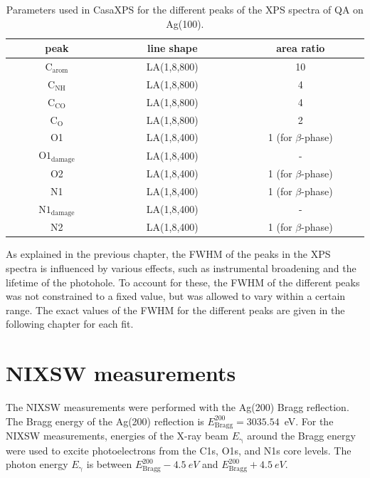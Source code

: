 \begin{table}[H]
	\centering
	\caption{Parameters used in CasaXPS\autocite{CasaSoftwareLtd2022} for the different peaks of the \ac{XPS} spectra of \ac{QA} on Ag(100).}
\begin{tabular}{@{}ccc@{}} \toprule
	~~~~~~peak~~~~~~ & ~~~~~~line shape~~~~~~ & ~~~~~~area ratio~~~~~~ \\
	\midrule
	$\mathrm{C_{arom}}$ & LA(1,8,800) & 10 \\
	$\mathrm{C_{NH}}$ & LA(1,8,800) & 4 \\
	$\mathrm{C_{CO}}$ & LA(1,8,800) & 4 \\
	$\mathrm{C_{O}}$ & LA(1,8,800) & 2 \\
	\midrule
	O1 & LA(1,8,400) & 1 (for $\beta$-phase) \\
	$\mathrm{O1_{damage}}$ & LA(1,8,400) & - \\
	O2 & LA(1,8,400) & 1 (for $\beta$-phase) \\
	\midrule
	N1 & LA(1,8,400) & 1 (for $\beta$-phase) \\
	$\mathrm{N1_{damage}}$  & LA(1,8,400) & - \\
	N2 & LA(1,8,400) & 1 (for $\beta$-phase) \\
	\bottomrule
\end{tabular}
	\label{tab:casa}
\end{table}

As explained in the previous chapter, the \ac{FWHM} of the peaks in the \ac{XPS} spectra is influenced by various effects, such as instrumental broadening and the lifetime of the photohole. To account for these, the \ac{FWHM} of the different peaks was not constrained to a fixed value, but was allowed to vary within a certain range. The exact values of the \ac{FWHM} for the different peaks are given in the following chapter for each fit. 

\section{NIXSW measurements}

The \ac{NIXSW} measurements were performed with the Ag(200) Bragg reflection. The Bragg energy of the Ag(200) reflection is $E^{200}_\mathrm{Bragg} = 3035.54$~\si{\eV}. For the \ac{NIXSW} measurements, energies of the X-ray beam $E_\mathrm{\gamma}$ around the Bragg energy were used to excite photoelectrons from the C1s, O1s, and N1s core levels. The photon energy $E_\mathrm{\gamma}$ is between $E^{200}_\mathrm{Bragg} - 4.5~\si{eV}$ and $E^{200}_\mathrm{Bragg} + 4.5~\si{eV}$.

